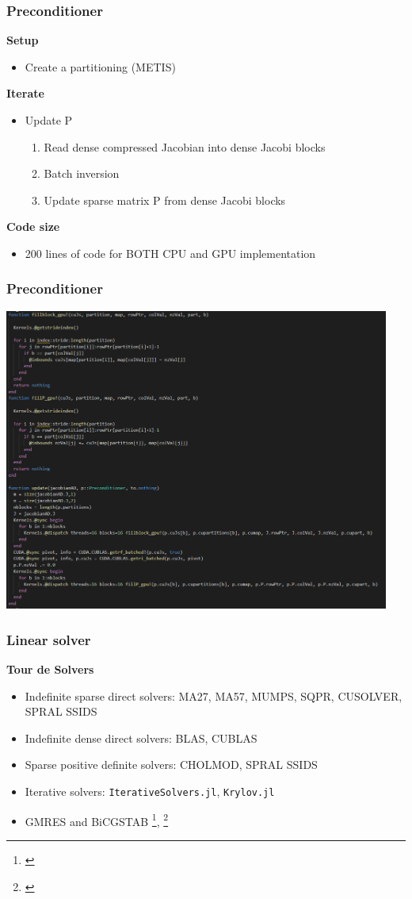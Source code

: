 \begin{frame}
  \frametitle{Preconditioner}
  {\bf Setup}
  \begin{itemize}
    \item Create a partitioning (METIS)
  \end{itemize}
  {\bf Iterate}
  \begin{itemize}
    \item Update P
    \begin{enumerate}
      \item Read dense compressed Jacobian into dense Jacobi blocks
      \item Batch inversion
      \item Update sparse matrix P from dense Jacobi blocks
    \end{enumerate}
  \end{itemize}
  {\bf Code size}
  \begin{itemize}
    \item 200 lines of code for BOTH CPU and GPU implementation
  \end{itemize}
\end{frame}

\begin{frame}
  \frametitle{Preconditioner}
  \includegraphics[width=0.95\textwidth]{figures/preconditioner}
\end{frame}

\begin{frame}
  \frametitle{Linear solver}
  {\bf Tour de Solvers}
  \begin{itemize}
    \item Indefinite sparse direct solvers: MA27, MA57, MUMPS, SQPR, CUSOLVER, SPRAL SSIDS
    \item Indefinite dense direct solvers: BLAS, CUBLAS
    \item Sparse positive definite solvers: CHOLMOD, SPRAL SSIDS
    \item Iterative solvers: \lstinline{IterativeSolvers.jl}, \lstinline{Krylov.jl} 
    \item GMRES and BiCGSTAB \footnote{\cite{bicgstabVorst}}, \footnote{\cite{sleijpen1993bicgstab}}
  \end{itemize}
\end{frame}

